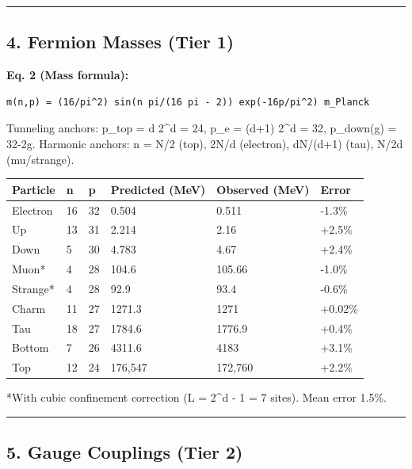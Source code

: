 \documentclass[
]{article}
\newcounter{none} %
\begin{document}
\begin{center}\rule{0.5\linewidth}{0.5pt}\end{center}

\subsection{4. Fermion Masses (Tier 1)}\label{fermion-masses-tier-1}

\textbf{Eq. 2 (Mass formula):}

\begin{verbatim}
m(n,p) = (16/pi^2) sin(n pi/(16 pi - 2)) exp(-16p/pi^2) m_Planck
\end{verbatim}

Tunneling anchors: p\_top = d 2\^{}d = 24, p\_e = (d+1) 2\^{}d = 32,
p\_down(g) = 32-2g. Harmonic anchors: n = N/2 (top), 2N/d (electron),
dN/(d+1) (tau), N/2d (mu/strange).

{\def\LTcaptype{none} %
\begin{longtable}[]{@{}llllll@{}}
\toprule\noalign{}
Particle & n & p & Predicted (MeV) & Observed (MeV) & Error \\
\midrule\noalign{}
\endhead
\bottomrule\noalign{}
\endlastfoot
Electron & 16 & 32 & 0.504 & 0.511 & -1.3\% \\
Up & 13 & 31 & 2.214 & 2.16 & +2.5\% \\
Down & 5 & 30 & 4.783 & 4.67 & +2.4\% \\
Muon* & 4 & 28 & 104.6 & 105.66 & -1.0\% \\
Strange* & 4 & 28 & 92.9 & 93.4 & -0.6\% \\
Charm & 11 & 27 & 1271.3 & 1271 & +0.02\% \\
Tau & 18 & 27 & 1784.6 & 1776.9 & +0.4\% \\
Bottom & 7 & 26 & 4311.6 & 4183 & +3.1\% \\
Top & 12 & 24 & 176,547 & 172,760 & +2.2\% \\
\end{longtable}
}

*With cubic confinement correction (L = 2\^{}d - 1 = 7 sites). Mean
error 1.5\%.

\begin{center}\rule{0.5\linewidth}{0.5pt}\end{center}

\subsection{5. Gauge Couplings (Tier 2)}\label{gauge-couplings-tier-2}
\end{document}
